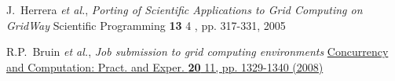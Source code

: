 \documentclass{elsart}
\def\etal {\textit{et al.}}
\begin{document}
\begin{linenumbers}
\begin{thebibliography}{00}
J.~Herrera \etal,
\textit{Porting of Scientific Applications to Grid Computing on GridWay}
{Scientific Programming \textbf{13} 4 , pp. 317-331, 2005}

R.P.~Bruin \etal,
\textit{Job submission to grid computing environments}
\href{httpL//dx/doi.org/10.1002/cpe.1290}
{Concurrency and Computation: Pract. and Exper. \textbf{20} 11, pp. 1329-1340 (2008)}






\end{thebibliography}
\end{linenumbers}
\end{document}

